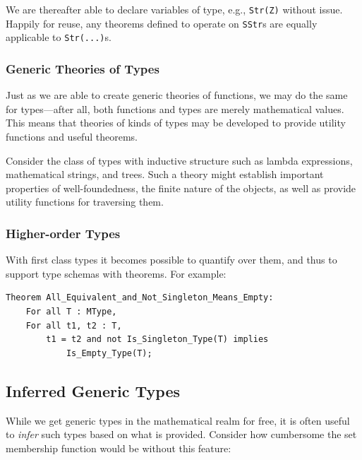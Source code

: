 We are thereafter able to declare variables of type, e.g., \texttt{Str(Z)} without issue.  Happily for reuse, any theorems defined to operate on \texttt{SStr}s are equally applicable to \texttt{Str(...)}s.

		\subsubsection{Generic Theories of Types\label{genericTheoriesTypes}}

Just as we are able to create generic theories of functions, we may do the same for types---after all, both functions and types are merely mathematical values.  This means that theories of kinds of types may be developed to provide utility functions and useful theorems.

Consider the class of types with inductive structure such as lambda expressions, mathematical strings, and trees.  Such a theory might establish important properties of well-foundedness, the finite nature of the objects, as well as provide utility functions for traversing them.

		\subsubsection{Higher-order Types\label{higherOrderTypes}}

With first class types it becomes possible to quantify over them, and thus to support type schemas with theorems.  For example:

\begin{lstlisting}
Theorem All_Equivalent_and_Not_Singleton_Means_Empty:
	For all T : MType,
	For all t1, t2 : T,
		t1 = t2 and not Is_Singleton_Type(T) implies
			Is_Empty_Type(T);
\end{lstlisting}

	\subsection{Inferred Generic Types\label{inferredGenericTypes}}

While we get generic types in the mathematical realm for free, it is often useful to \emph{infer} such types based on what is provided.  Consider how cumbersome the set membership function would be without this feature:

